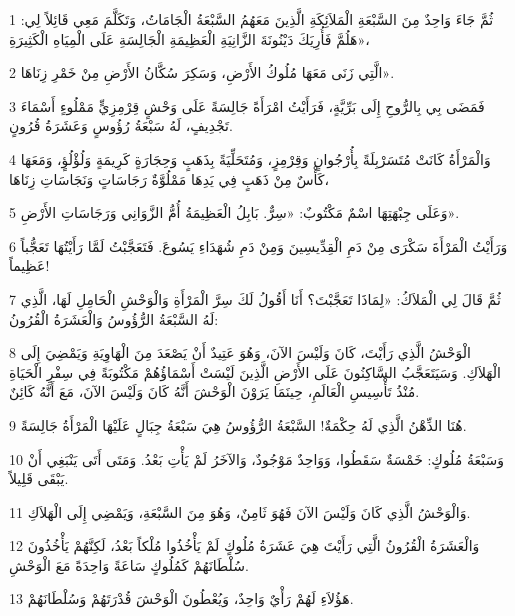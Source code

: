 \par 1 ثُمَّ جَاءَ وَاحِدٌ مِنَ السَّبْعَةِ الْمَلاَئِكَةِ الَّذِينَ مَعَهُمُ السَّبْعَةُ الْجَامَاتُ، وَتَكَلَّمَ مَعِي قَائِلاً لِي: «هَلُمَّ فَأُرِيَكَ دَيْنُونَةَ الزَّانِيَةِ الْعَظِيمَةِ الْجَالِسَةِ عَلَى الْمِيَاهِ الْكَثِيرَةِ،
\par 2 الَّتِي زَنَى مَعَهَا مُلُوكُ الأَرْضِ، وَسَكِرَ سُكَّانُ الأَرْضِ مِنْ خَمْرِ زِنَاهَا».
\par 3 فَمَضَى بِي بِالرُّوحِ إِلَى بَرِّيَّةٍ، فَرَأَيْتُ امْرَأَةً جَالِسَةً عَلَى وَحْشٍ قِرْمِزِيٍّ مَمْلُوءٍ أَسْمَاءَ تَجْدِيفٍ، لَهُ سَبْعَةُ رُؤُوسٍ وَعَشَرَةُ قُرُونٍ.
\par 4 وَالْمَرْأَةُ كَانَتْ مُتَسَرْبِلَةً بِأُرْجُوانٍ وَقِرْمِزٍ، وَمُتَحَلِّيَةً بِذَهَبٍ وَحِجَارَةٍ كَرِيمَةٍ وَلُؤْلُؤٍ، وَمَعَهَا كَأْسٌ مِنْ ذَهَبٍ فِي يَدِهَا مَمْلُوَّةٌ رَجَاسَاتٍ وَنَجَاسَاتِ زِنَاهَا،
\par 5 وَعَلَى جِبْهَتِهَا اسْمٌ مَكْتُوبٌ: «سِرٌّ. بَابِلُ الْعَظِيمَةُ أُمُّ الزَّوَانِي وَرَجَاسَاتِ الأَرْضِ».
\par 6 وَرَأَيْتُ الْمَرْأَةَ سَكْرَى مِنْ دَمِ الْقِدِّيسِينَ وَمِنْ دَمِ شُهَدَاءِ يَسُوعَ. فَتَعَجَّبْتُ لَمَّا رَأَيْتُهَا تَعَجُّباً عَظِيماً!
\par 7 ثُمَّ قَالَ لِي الْمَلاَكُ: «لِمَاذَا تَعَجَّبْتَ؟ أَنَا أَقُولُ لَكَ سِرَّ الْمَرْأَةِ وَالْوَحْشِ الْحَامِلِ لَهَا، الَّذِي لَهُ السَّبْعَةُ الرُّؤُوسُ وَالْعَشَرَةُ الْقُرُونُ:
\par 8 الْوَحْشُ الَّذِي رَأَيْتَ، كَانَ وَلَيْسَ الآنَ، وَهُوَ عَتِيدٌ أَنْ يَصْعَدَ مِنَ الْهَاوِيَةِ وَيَمْضِيَ إِلَى الْهَلاَكِ. وَسَيَتَعَجَّبُ السَّاكِنُونَ عَلَى الأَرْضِ الَّذِينَ لَيْسَتْ أَسْمَاؤُهُمْ مَكْتُوبَةً فِي سِفْرِ الْحَيَاةِ مُنْذُ تَأْسِيسِ الْعَالَمِ، حِينَمَا يَرَوْنَ الْوَحْشَ أَنَّهُ كَانَ وَلَيْسَ الآنَ، مَعَ أَنَّهُ كَائِنٌ.
\par 9 هُنَا الذِّهْنُ الَّذِي لَهُ حِكْمَةٌ! السَّبْعَةُ الرُّؤُوسُ هِيَ سَبْعَةُ جِبَالٍ عَلَيْهَا الْمَرْأَةُ جَالِسَةً.
\par 10 وَسَبْعَةُ مُلُوكٍ: خَمْسَةٌ سَقَطُوا، وَوَاحِدٌ مَوْجُودٌ، وَالآخَرُ لَمْ يَأْتِ بَعْدُ. وَمَتَى أَتَى يَنْبَغِي أَنْ يَبْقَى قَلِيلاً.
\par 11 وَالْوَحْشُ الَّذِي كَانَ وَلَيْسَ الآنَ فَهُوَ ثَامِنٌ، وَهُوَ مِنَ السَّبْعَةِ، وَيَمْضِي إِلَى الْهَلاَكِ.
\par 12 وَالْعَشَرَةُ الْقُرُونُ الَّتِي رَأَيْتَ هِيَ عَشَرَةُ مُلُوكٍ لَمْ يَأْخُذُوا مُلْكاً بَعْدُ، لَكِنَّهُمْ يَأْخُذُونَ سُلْطَانَهُمْ كَمُلُوكٍ سَاعَةً وَاحِدَةً مَعَ الْوَحْشِ.
\par 13 هَؤُلاَءِ لَهُمْ رَأْيٌ وَاحِدٌ، وَيُعْطُونَ الْوَحْشَ قُدْرَتَهُمْ وَسُلْطَانَهُمْ.

